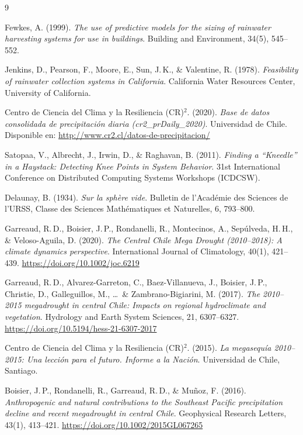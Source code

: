 \documentclass[12pt, a4paper]{article}
\begin{document}
\begin{thebibliography}{9}

Fewkes, A. (1999). \textit{The use of predictive models for the sizing of rainwater harvesting systems for use in buildings}. Building and Environment, 34(5), 545--552.

Jenkins, D., Pearson, F., Moore, E., Sun, J.\,K., \& Valentine, R. (1978). \textit{Feasibility of rainwater collection systems in California}. California Water Resources Center, University of California.

Centro de Ciencia del Clima y la Resiliencia (CR)$^2$. (2020). \textit{Base de datos consolidada de precipitación diaria (cr2\_prDaily\_2020)}. Universidad de Chile. Disponible en: \url{http://www.cr2.cl/datos-de-precipitacion/}

Satopaa, V., Albrecht, J., Irwin, D., \& Raghavan, B. (2011). \textit{Finding a ``Kneedle'' in a Haystack: Detecting Knee Points in System Behavior}. 31st International Conference on Distributed Computing Systems Workshops (ICDCSW).

Delaunay, B. (1934). \textit{Sur la sphère vide}. Bulletin de l'Académie des Sciences de l'URSS, Classe des Sciences Mathématiques et Naturelles, 6, 793--800.

Garreaud, R.\,D., Boisier, J.\,P., Rondanelli, R., Montecinos, A., Sepúlveda, H.\,H., \& Veloso-Aguila, D. (2020). \textit{The Central Chile Mega Drought (2010--2018): A climate dynamics perspective}. International Journal of Climatology, 40(1), 421--439. \url{https://doi.org/10.1002/joc.6219}

Garreaud, R.\,D., Alvarez-Garreton, C., Baez-Villanueva, J., Boisier, J.\,P., Christie, D., Galleguillos, M., \ldots\ \& Zambrano-Bigiarini, M. (2017). \textit{The 2010--2015 megadrought in central Chile: Impacts on regional hydroclimate and vegetation}. Hydrology and Earth System Sciences, 21, 6307--6327. \url{https://doi.org/10.5194/hess-21-6307-2017}

Centro de Ciencia del Clima y la Resiliencia (CR)$^2$. (2015). \textit{La megasequía 2010--2015: Una lección para el futuro. Informe a la Nación}. Universidad de Chile, Santiago.

Boisier, J.\,P., Rondanelli, R., Garreaud, R.\,D., \& Muñoz, F. (2016). \textit{Anthropogenic and natural contributions to the Southeast Pacific precipitation decline and recent megadrought in central Chile}. Geophysical Research Letters, 43(1), 413--421. \url{https://doi.org/10.1002/2015GL067265}


\end{thebibliography}
\end{document}
